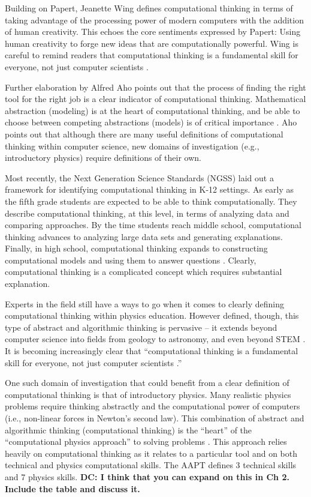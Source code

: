\documentclass{msuphddissertation}
\begin{document}
\begin{doublespace}
Building on Papert, Jeanette Wing defines computational thinking in terms of taking advantage of the processing power of modern computers with the addition of human creativity.  This echoes the core sentiments expressed by Papert: Using human creativity to forge new ideas that are computationally powerful.  Wing is careful to remind readers that computational thinking is a fundamental skill for everyone, not just computer scientists \cite{Wing2008}.

Further elaboration by Alfred Aho points out that the process of finding the right tool for the right job is a clear indicator of computational thinking.  Mathematical abstraction (modeling) is at the heart of computational thinking, and be able to choose between competing abstractions (models) is of critical importance \cite{Aho2012}.  Aho points out that although there are many useful definitions of computational thinking within computer science, new domains of investigation (e.g., introductory physics) require definitions of their own.

Most recently, the Next Generation Science Standards (NGSS) laid out a framework for identifying computational thinking in K-12 settings.  As early as the fifth grade students are expected to be able to think computationally.  They describe computational thinking, at this level, in terms of analyzing data and comparing approaches.  By the time students reach middle school, computational thinking advances to analyzing large data sets and generating explanations.  Finally, in high school, computational thinking expands to constructing computational models and using them to answer questions \cite{NGSS2012}.  Clearly, computational thinking is a complicated concept which requires substantial explanation.

Experts in the field still have a ways to go when it comes to clearly defining computational thinking within physics education.  However defined, though, this type of abstract and algorithmic thinking is pervasive -- it extends beyond computer science into fields from geology to astronomy, and even beyond STEM \cite{Bundy2007}.  It is becoming increasingly clear that ``computational thinking is a fundamental skill for everyone, not just computer scientists \cite{Wing2006}.'' 

One such domain of investigation that could benefit from a clear definition of computational thinking is that of introductory physics.  Many realistic physics problems require thinking abstractly and the computational power of computers (i.e., non-linear forces in Newton's second law).  This combination of abstract and algorithmic thinking (computational thinking) is the ``heart'' of the ``computational physics approach'' to solving problems \cite{AAPT2016}.  This approach relies heavily on computational thinking as it relates to a particular tool and on both technical and physics computational skills.  The AAPT defines 3 technical skills and 7 physics skills. {\bf DC: I think that you can expand on this in Ch 2. Include the table and discuss it.}


\end{doublespace}
\end{document}
